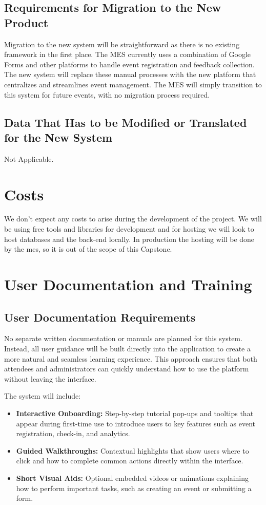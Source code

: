 \documentclass[12pt]{article}
\begin{document}
\subsection{Requirements for Migration to the New Product}
Migration to the new system will be straightforward as there is no existing framework in the first place. The MES currently uses a combination of Google Forms and other platforms to handle event registration and feedback collection. The new system will replace these manual processes with the new platform that centralizes and streamlines event management. The MES will simply transition to this system for future events, with no migration process required.
\subsection{Data That Has to be Modified or Translated for the New System}
Not Applicable.

\section{Costs}
We don't expect any costs to arise during the development of the project. We will be using free tools and libraries for
development and for hosting we will look to host databases and the back-end locally. In production the hosting will be
done by the \gls{mes}, so it is out of the scope of this Capstone.

\section{User Documentation and Training}

\subsection{User Documentation Requirements}

No separate written documentation or manuals are planned for this system.
Instead, all user guidance will be built directly into the application to create a more natural and seamless learning experience.
This approach ensures that both attendees and administrators can quickly understand how to use the platform without leaving the interface.

The system will include:
\begin{itemize}
    \item \textbf{Interactive Onboarding:}
    Step-by-step tutorial pop-ups and tooltips that appear during first-time use to introduce users to key features such as event registration, check-in, and analytics.

    \item \textbf{Guided Walkthroughs:}
    Contextual highlights that show users where to click and how to complete common actions directly within the interface.

    \item \textbf{Short Visual Aids:}
    Optional embedded videos or animations explaining how to perform important tasks, such as creating an event or submitting a form.
\end{itemize}
\end{document}
